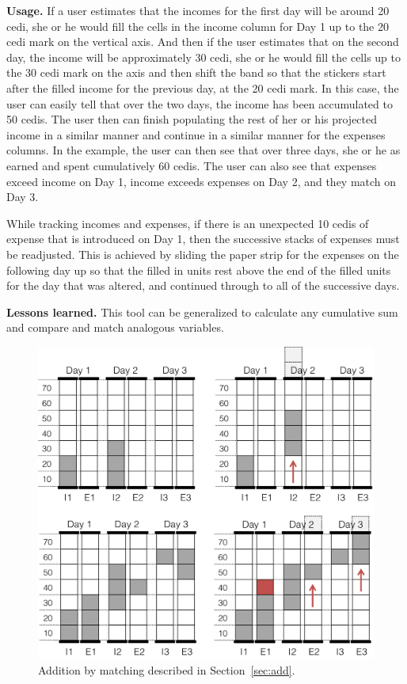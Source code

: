 \documentclass{sig-alternate}
\begin{document}
\textbf{Usage.} If a user estimates that the incomes for the first day will be around 20 cedi, she or he would fill the cells in the income column for Day 1 up to the 20 cedi mark on the vertical axis. And then if the user estimates that on the second day, the income will be approximately 30 cedi, she or he would fill the cells up to the 30 cedi mark on the axis and then shift the band so that the stickers start after the filled income for the previous day, at the 20 cedi mark. In this case, the user can easily tell that over the two days, the income has been accumulated to 50 cedis. The user then can finish populating the rest of her or his projected income in a similar manner and continue in a similar manner for the expenses columns. In the example, the user can then see that over three days, she or he as earned and spent cumulatively 60 cedis. The user can also see that expenses exceed income on Day 1, income exceeds expenses on Day 2, and they match on Day 3.

While tracking incomes and expenses, if there is an unexpected 10 cedis of expense that is introduced on Day 1, then the successive stacks of expenses must be readjusted. This is achieved by sliding the paper strip for the expenses on the following day up so that the filled in units rest above the end of the filled units for the day that was altered, and continued through to all of the successive days.


\textbf{Lessons learned.} This tool can be generalized to calculate any cumulative sum and compare and match analogous variables.

\begin{figure}
\centering
\includegraphics[width=.9\linewidth]{img/add.png}
\caption{Addition by matching described in Section~\ref{sec:add}.}
\label{fig:add}
\end{figure}
\end{document}

